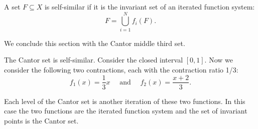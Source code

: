 \begin{definition}
    A set $F\subseteq X$ is self-similar if it is the invariant set of an iterated function system:
    $$F = \bigcup_{i=1}^N f_i(F).$$
\end{definition}
We conclude this section with the Cantor middle third set.  
\begin{example}
    The Cantor set is self-similar.  Consider the closed interval $[0,1]$.  Now we consider the following two contractions, each with the contraction ratio 1/3: 
    $$f_1 (x) = \frac{1}{3}x \quad \text{ and } \quad f_2 (x) = \frac{x+2}{3}.$$

    Each level of the Cantor set is another iteration of these two functions.  In this case the two functions are the iterated function system and the set of invariant points is the Cantor set.  
\end{example}